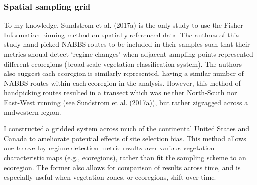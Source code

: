 \documentclass[12pt,twoside,openany]{reedthesis}
\begin{document}
\subsubsection{Spatial sampling grid}\label{spatial-sampling-grid}

To my knowledge, Sundstrom et al. (2017a) is the only study to use the
Fisher Information binning method on spatially-referenced data. The
authors of this study hand-picked NABBS routes to be included in their
samples such that their metrics should detect `regime changes' when
adjacent sampling points represented different ecoregions (broad-scale
vegetation classification system). The authors also suggest each
ecoregion is similarly represented, having a similar number of NABBS
routes within each ecoregion in the analysis. However, this method of
handpicking routes resulted in a transect which was neither North-South
nor East-West running (see Sundstrom et al. (2017a)), but rather
zigzagged across a midwestern region.

I constructed a gridded system across much of the continental United
States and Canada to ameliorate potential effects of site selection
bias. This method allows one to overlay regime detection metric results
over various vegetation characteristic maps (e.g., ecoregions), rather
than fit the sampling scheme to an ecoregion. The former also allows for
comparison of results across time, and is especially useful when
vegetation zones, or ecoregions, shift over time.
\end{document}

